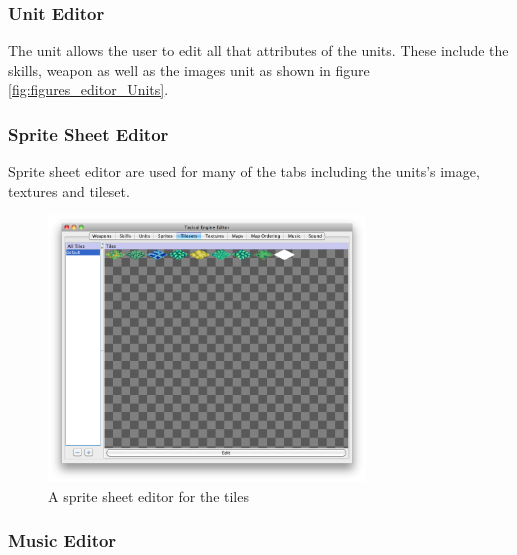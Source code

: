 \subsubsection{Unit Editor}
\label{ssub:unit_editors}
The unit allows the user to edit all that attributes of the units. These include the skills, weapon as well as the images unit as shown in figure \ref{fig:figures_editor_Units}. 


\subsubsection{Sprite Sheet Editor}
Sprite sheet editor are used for many of the tabs including the units's image, textures and tileset.
\begin{figure}[htbp]
	\centering
		\includegraphics[width=0.75\textwidth]{figures/editor/tileset_edit.png}
	\caption{A sprite sheet  editor for the tiles}
	\label{fig:figures_editor_tileset_edit}
\end{figure}

\subsubsection{Music Editor}
\label{ssub:music_editor}

